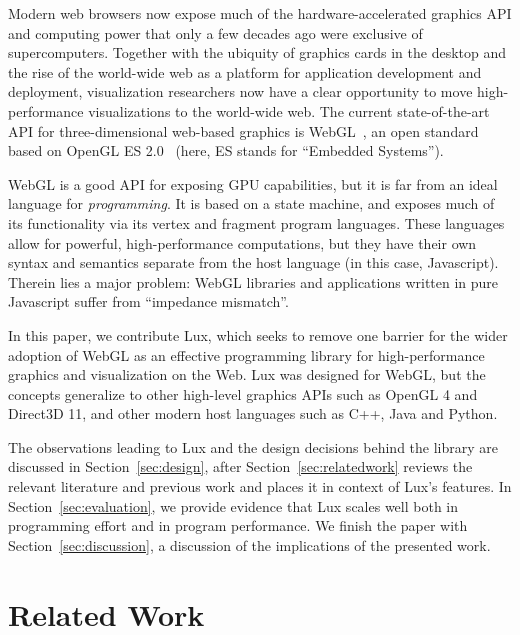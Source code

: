 Modern web browsers now expose much of the hardware-accelerated
graphics API and computing power that only a few decades ago were
exclusive of supercomputers.
%
Together with the ubiquity of graphics
cards in the desktop and the rise of the world-wide web as a platform
for application development and deployment, visualization researchers
now have a clear opportunity to move high-performance visualizations to
the world-wide web.
%
The current state-of-the-art API for three-dimensional web-based
graphics is WebGL~\cite{webgl-spec}, an open standard based on OpenGL
ES 2.0~\cite{opengles-spec} (here, ES stands for ``Embedded
Systems'').

WebGL is a good API for exposing GPU capabilities,
but it is far from an ideal language for \emph{programming}.
%
It is based on a state machine, and exposes much of its functionality
via its vertex and fragment program languages. These languages allow
for powerful, high-performance computations, but they have
their own syntax and semantics separate from the host language (in
this case, Javascript). Therein lies a major problem:
WebGL libraries and applications written in pure Javascript 
suffer from ``impedance mismatch''.

In this paper, we contribute Lux, which seeks to remove one barrier
for the wider adoption of WebGL as an effective programming library
for high-performance graphics and visualization on the Web.
%
%
Lux was designed for WebGL, but the concepts generalize to
other high-level graphics APIs such as OpenGL 4 and Direct3D 11, and
other modern host languages such as C++, Java and Python.

The observations leading to Lux and the design decisions behind the
library are discussed in Section~\ref{sec:design}, after
Section~\ref{sec:relatedwork} reviews the relevant literature and
previous work and
places it in context of Lux's features. In
Section~\ref{sec:evaluation}, we provide evidence that Lux scales
well both in programming effort and in program performance. 
We finish the paper with Section~\ref{sec:discussion}, a discussion of
the implications of the presented work.

\section{Related Work\label{sec:relatedwork}}

